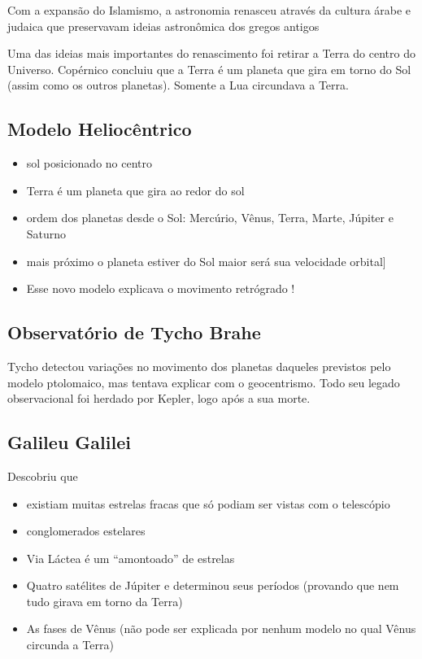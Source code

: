 \documentclass{article}
\begin{document}
Com a expansão do Islamismo, a astronomia renasceu através da cultura
árabe  e judaica que preservavam ideias astronômica dos gregos 
antigos

Uma das ideias mais importantes 
do renascimento foi retirar a Terra do centro do Universo. Copérnico
concluiu que a Terra é um planeta que gira em torno do Sol (assim 
como os outros planetas). Somente a Lua circundava a Terra. 

\subsection{Modelo Heliocêntrico}

\begin{itemize}
    \item sol posicionado no centro
    \item Terra é um planeta que gira ao redor do sol
    \item ordem dos planetas desde o Sol: Mercúrio, Vênus, Terra, Marte, Júpiter e Saturno
    \item mais próximo o planeta estiver do Sol maior será sua velocidade orbital]
    \item Esse novo modelo explicava o movimento retrógrado !
\end{itemize}

\subsection{Observatório de Tycho Brahe}

Tycho detectou variações no movimento dos planetas daqueles 
previstos pelo modelo ptolomaico, mas tentava explicar com o 
geocentrismo.
Todo seu legado observacional foi herdado por  Kepler, logo após 
a sua morte.

\subsection{Galileu Galilei}

Descobriu que

\begin{itemize}
    \item existiam muitas estrelas fracas que só podiam ser vistas com 
    o telescópio
    \item conglomerados estelares
    \item Via Láctea é um “amontoado” de estrelas
    \item Quatro satélites de Júpiter e determinou seus períodos 
    (provando que nem tudo girava em torno da Terra)
    \item As fases de Vênus (não pode ser explicada por nenhum 
    modelo no qual Vênus circunda a Terra)
\end{itemize}
\end{document}
